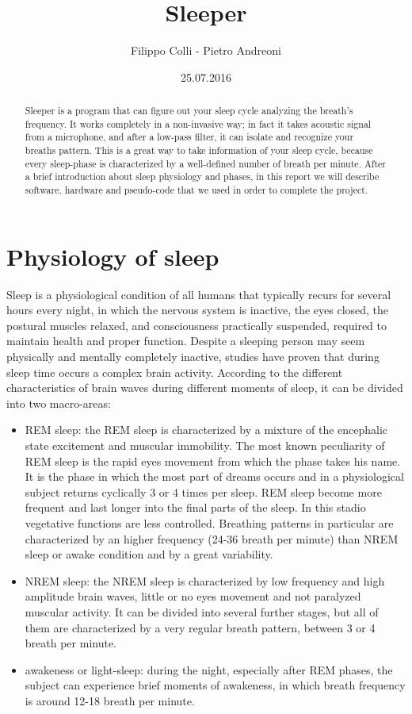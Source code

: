 \documentclass [18pt] {article}
\begin{document}
	\title {Sleeper}
	\author{Filippo Colli - Pietro Andreoni}
	\date{25.07.2016}
	\maketitle
	\begin{abstract}
	Sleeper is a program that can figure out your sleep cycle analyzing the breath's frequency. It works completely in a non-invasive way; in fact it takes acoustic
	signal from a microphone, and after a low-pass filter, it can isolate and recognize your breaths pattern.
	This is a great way to take information of your sleep cycle, because every sleep-phase is characterized by a well-defined number of breath per minute.
	After a brief introduction about sleep physiology and phases, in this report we will describe software, hardware and pseudo-code that we used in order to
	complete the project.
	\end{abstract}
	\pagebreak
	\section*{Physiology of sleep}
	Sleep is a physiological condition of all humans that typically recurs for several hours every night, in which the nervous system is inactive, the eyes closed, the
	postural muscles relaxed, and consciousness practically suspended, required to maintain health and proper function.
	Despite a sleeping person may seem physically and mentally completely inactive, studies have proven that during sleep time occurs a complex brain
	activity. According to the different characteristics of brain waves during different moments of sleep, it can be divided into two macro-areas:
	\begin{itemize}
	\item REM sleep: the REM sleep is characterized by a mixture of the encephalic state excitement and muscular immobility. The most known peculiarity of REM 
	sleep is the rapid eyes movement from which the phase takes his name. It is the phase in which the most part of dreams occurs and in a physiological subject 
	returns cyclically 3 or 4 times per sleep. REM sleep become more frequent and last longer into the final parts of the sleep. In this stadio vegetative functions are
	less controlled. Breathing patterns in particular are characterized by an higher frequency (24-36 breath per minute) than NREM sleep or awake condition and by 
	a great variability.
	\item NREM sleep: the NREM sleep is characterized by low frequency and high amplitude brain waves, little or no eyes movement and not paralyzed muscular
	activity. It can be divided into several further stages, but all of them are characterized by a very regular breath pattern, between 3 or 4 breath per minute.
	\item awakeness or light-sleep:  during the night, especially after REM phases, the subject can experience brief moments of awakeness, in which breath
	frequency is around 12-18 breath per minute.
	\end{itemize}
\end{document}
